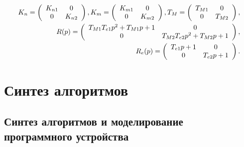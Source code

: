 \begin{equation}
\label{eq:p4:s3.10}
\begin{aligned}
K_n = \left( \begin{array}{c c}
K_{n1} & 0 \\
0 & K_{n2}
\end{array}\right),
K_m = \left( \begin{array}{c c}
K_{m1} & 0 \\
0 & K_{m2}
\end{array}\right), 
T_M = \left( \begin{array}{c c}
T_{M1} & 0 \\
0 & T_{M2}
\end{array}\right), \\
R(p) = \left( \begin{array}{c c}
T_{M1} T_{e1} p^2 + T_{M1} p +1 & 0 \\
0 & T_{M2} T_{e2} p^2 + T_{M2} p +1
\end{array}\right), \\
R_e(p) = \left( \begin{array}{c c}
T_{e1} p + 1 & 0 \\
0 & T_{e2} p + 1
\end{array}\right).
\end{aligned}
\end{equation}

\begin{comment}
\subsection{Уравнения движения привода по азимуту} \label{subsec:ch4/sect3/sub1}

Линеаризованные уравнения движения азимутального привода совместно с объектом управления запишутся [29] [30] [31] [32] [33] [34]:

\subsection{Уравнения движения привода по углу места} \label{subsec:ch4/sect3/sub2}
\end{comment}

\section{Синтез алгоритмов} \label{ch:ch4/synthesis}

\subsection{Синтез алгоритмов и моделирование программного устройства} \label{ch:ch4/sect2+}

